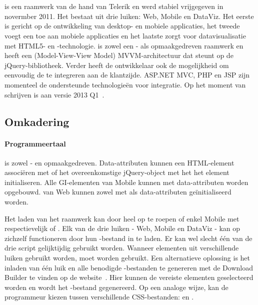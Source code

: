 \section{\kendo}
\label{sec:raamwerk-kendo}
\kendo{} is een raamwerk van de hand van Telerik en werd stabiel vrijgegeven in novermber 2011.
Het bestaat uit drie luiken:  Web, Mobile en DataViz.  
Het eerste is gericht op de ontwikkeling van desktop- en mobiele applicaties,  het tweede voegt een  toe aan mobiele applicaties en het laatste zorgt voor datavisualisatie met HTML5- en \js{}-technologie.
\kendo{} is zowel een \js{}- als opmaakgedreven raamwerk en heeft een (Model-View-View Model) MVVM-architectuur dat steunt op de jQuery-bibliotheek.
Verder heeft de ontwikkelaar ook de mogelijkheid om eenvoudig de  te integreren aan de klantzijde.
ASP.NET MVC,  PHP en JSP zijn momenteel de ondersteunde technologieën voor integratie.
Op het moment van schrijven is \kendo{} aan versie 2013 Q1~\cite{Telerike}. 

\subsection{Omkadering}
\label{sec:kendo-omkadering}

\paragraph{Programmeertaal}
\kendo{} is zowel \js{}- en opmaakgedreven. 
Data-attributen kunnen een HTML-element associëren met \kendo{} of het overeenkomstige jQuery-object met \js{} het het element initialiseren.
Alle GI-elementen van \kendo{} Mobile kunnen met data-attributen worden opgebouwd.
 van \kendo{} Web kunnen zowel met \js{} als data-attributen geïnitialiseerd worden.

Het laden van het raamwerk kan door heel \kendo{} op te roepen of enkel \kendo{} Mobile met respectievelijk  of .
Elk van de drie luiken - Web, Mobile en DataViz - kan op zichzelf functioneren door hun \js{}-bestand in te laden.
Er kan wel slecht één van de drie script gelijktijdig gebruikt worden.  
Wanneer elementen uit verschillende luiken gebruikt worden, moet  worden gebruikt.
Een alternatieve oplossing is het inladen van één luik en alle benodigde \js{}-bestanden te genereren met de \js{} Download Builder te vinden op de \kendo{} website~\cite{Telerike}.
Hier kunnen de vereiste elementen geselecteerd worden en wordt het \js{}-bestand gegenereerd.
Op een analoge wijze, kan de programmeur kiezen tussen verschillende CSS-bestanden:   en .

